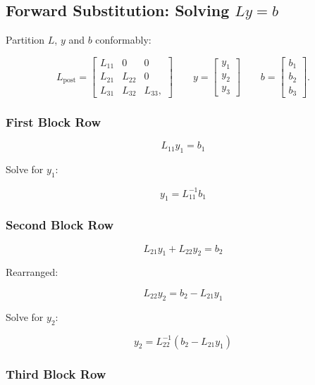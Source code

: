 \documentclass[
  letterpaper,
  DIV=11,
  numbers=noendperiod]{scrartcl}
\begin{document}
\subsection{\texorpdfstring{Forward Substitution: Solving
\(Ly = b\)}{Forward Substitution: Solving Ly = b}}\label{forward-substitution-solving-ly-b}

Partition \(L\), \(y\) and \(b\) conformably:

\[
L_\text{post} = \begin{bmatrix}
L_{11} & 0 & 0 \\
L_{21} & L_{22} & 0 \\
L_{31} & L_{32} & L_{33},
\end{bmatrix} \qquad
y = \begin{bmatrix}
y_1 \\
y_2 \\
y_3
\end{bmatrix} \qquad
b = \begin{bmatrix}
b_1 \\
b_2 \\
b_3
\end{bmatrix}.
\]

\subsubsection{\texorpdfstring{\textbf{First Block
Row}}{First Block Row}}\label{first-block-row}

\[
L_{11} y_1 = b_1
\]

Solve for \(y_1\):

\[
y_1 = L_{11}^{-1}b_1
\]

\subsubsection{\texorpdfstring{\textbf{Second Block
Row}}{Second Block Row}}\label{second-block-row}

\[
L_{21}y_1 + L_{22}y_2 = b_2
\]

Rearranged:

\[
L_{22}y_2 = b_2 - L_{21}y_1
\]

Solve for \(y_2\):

\[
y_2 = L_{22}^{-1}\left(b_2 - L_{21}y_1\right)
\]

\subsubsection{\texorpdfstring{\textbf{Third Block
Row}}{Third Block Row}}\label{third-block-row}
\end{document}
